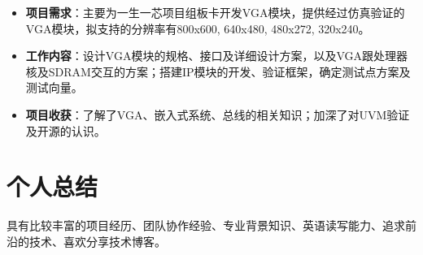 \documentclass{resume}
\begin{document}
\begin{itemize}
    \item \textbf{项目需求}：主要为一生一芯项目组板卡开发VGA模块，提供经过仿真验证的VGA模块，拟支持的分辨率有800x600, 640x480, 480x272, 320x240。
    \item \textbf{工作内容}：设计VGA模块的规格、接口及详细设计方案，以及VGA跟处理器核及SDRAM交互的方案；搭建IP模块的开发、验证框架，确定测试点方案及测试向量。
    \item \textbf{项目收获}：了解了VGA、嵌入式系统、总线的相关知识；加深了对UVM验证及开源的认识。
\end{itemize}

\section{个人总结}
具有比较丰富的项目经历、团队协作经验、专业背景知识、英语读写能力、追求前沿的技术、喜欢分享技术博客。
\end{document}
